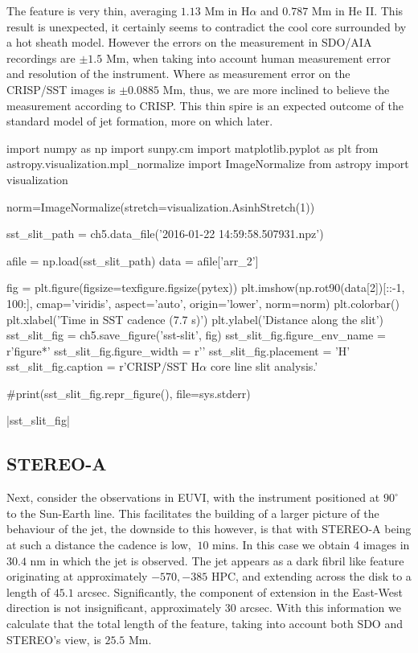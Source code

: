 The feature is very thin, averaging $1.13$ Mm in H$\alpha$ and $0.787$ Mm in He II. 
This result is unexpected, it certainly seems to contradict the cool core surrounded by a hot sheath model.
However the errors on the measurement in SDO/AIA recordings are $\pm1.5$ Mm, when taking into account human measurement error and resolution of the instrument.
Where as measurement error on the CRISP/SST images is $\pm0.0885$ Mm, thus, we are more inclined to believe the measurement according to CRISP.
This thin spire is an expected outcome of the standard model of jet formation, more on which later.




\begin{pycode}[chapter5]
import numpy as np
import sunpy.cm
import matplotlib.pyplot as plt
from astropy.visualization.mpl_normalize import ImageNormalize 
from astropy import visualization

norm=ImageNormalize(stretch=visualization.AsinhStretch(1))

sst_slit_path = ch5.data_file('2016-01-22 14:59:58.507931.npz')

afile = np.load(sst_slit_path)
data = afile['arr_2']

fig = plt.figure(figsize=texfigure.figsize(pytex))
plt.imshow(np.rot90(data[2])[::-1, 100:], cmap='viridis', aspect='auto', origin='lower', norm=norm)
plt.colorbar()
plt.xlabel('Time in SST cadence (7.7 s)')
plt.ylabel('Distance along the slit')
sst_slit_fig = ch5.save_figure('sst-slit', fig)
sst_slit_fig.figure_env_name = r'figure*'
sst_slit_fig.figure_width = r'\columnwidth'
sst_slit_fig.placement = 'H'
sst_slit_fig.caption = r'CRISP/SST H$\alpha$ core line slit analysis.'

#print(sst_slit_fig.repr_figure(), file=sys.stderr)
\end{pycode}

\py[chapter5]|sst_slit_fig|



\subsection{STEREO-A}
Next, consider the observations in EUVI, with the instrument positioned at $90^{\circ}$ to the Sun-Earth line.
This facilitates the building of a larger picture of the behaviour of the jet, the downside to this however, is that with STEREO-A being at such a distance the cadence is low, $~10$ mins.
In this case we obtain 4 images in $30.4$ nm in which the jet is observed.
The jet appears as a dark fibril like feature originating at approximately $-570, -385$ HPC, and extending across the disk to a length of $45.1$ arcsec.
Significantly, the component of extension in the East-West direction is not insignificant, approximately $30$ arcsec.
With this information we calculate that the total length of the feature, taking into account both SDO and STEREO's view, is $25.5$ Mm.




